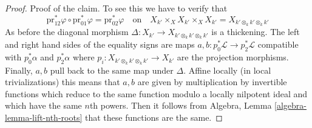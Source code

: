 \begin{proof}
\medskip\noindent
Proof of the claim. To see this we have to verify that
$$
\text{pr}_{12}^*\varphi \circ
\text{pr}_{01}^*\varphi =
\text{pr}_{02}^*\varphi
\quad\text{on}\quad
X_{k'} \times_X X_{k'} \times_X X_{k'} = X_{k' \otimes_k k' \otimes_k k'}
$$
As before the diagonal morphism
$\Delta : X_{k'} \to X_{k' \otimes_k k' \otimes_k k'}$
is a thickening. The left and right hand sides of the equality signs
are maps $a, b : p_0^*\mathcal{L} \to p_2^*\mathcal{L}$ compatible with
$p_0^*\alpha$ and $p_2^*\alpha$ where
$p_i : X_{k' \otimes_k k' \otimes_k k'} \to X_{k'}$
are the projection morphisms. Finally, $a, b$ pull back to the
same map under $\Delta$.
Affine locally (in local trivializations) this means that
$a, b$ are given by multiplication by invertible functions
which reduce to the same function modulo a locally nilpotent
ideal and which have the same $n$th powers. Then it follows
from Algebra, Lemma \ref{algebra-lemma-lift-nth-roots}
that these functions are the same.
\end{proof}











